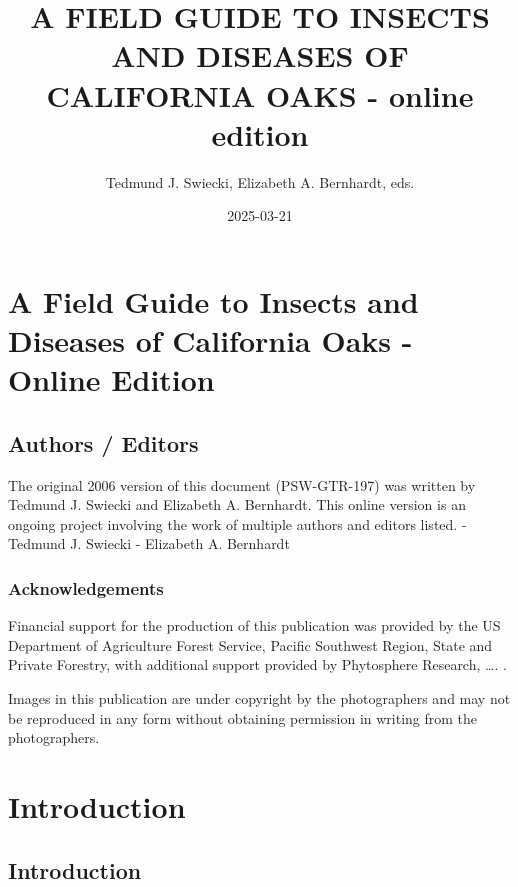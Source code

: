 \documentclass[
]{book}
\title{A FIELD GUIDE TO INSECTS AND DISEASES OF CALIFORNIA OAKS - online edition}
\author{Tedmund J. Swiecki, Elizabeth A. Bernhardt, eds.}
\date{2025-03-21}
\begin{document}
\maketitle

{
\setcounter{tocdepth}{2}
\tableofcontents
}
\part*{A Field Guide to Insects and Diseases of California Oaks - Online Edition}\label{part-a-field-guide-to-insects-and-diseases-of-california-oaks---online-edition}

\chapter*{Authors / Editors}\label{frontmatter}

The original 2006 version of this document (PSW-GTR-197) was written by Tedmund J. Swiecki and Elizabeth A. Bernhardt. This online version is an ongoing project involving the work of multiple authors and editors listed.
- Tedmund J. Swiecki
- Elizabeth A. Bernhardt

\section*{Acknowledgements}\label{acknowledgements}

Financial support for the production of this publication was provided by the US Department of Agriculture Forest Service, Pacific Southwest Region, State and Private Forestry, with additional support provided by Phytosphere Research, \ldots. .

Images in this publication are under copyright by the photographers and may not be reproduced in any form without obtaining permission in writing from the photographers.

\part*{Introduction}\label{part-introduction}

\chapter{Introduction}\label{Intro}
\end{document}
